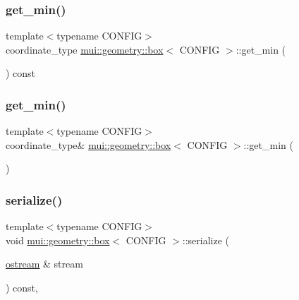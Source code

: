 \subsubsection{\texorpdfstring{get\+\_\+min()}{get\_min()}\hspace{0.1cm}{\footnotesize\ttfamily [1/2]}}
{\footnotesize\ttfamily template$<$typename C\+O\+N\+F\+IG$>$ \\
coordinate\+\_\+type \hyperlink{classmui_1_1geometry_1_1box}{mui\+::geometry\+::box}$<$ C\+O\+N\+F\+IG $>$\+::get\+\_\+min (\begin{DoxyParamCaption}{ }\end{DoxyParamCaption}) const\hspace{0.3cm}{\ttfamily [inline]}}

\mbox{\label{classmui_1_1geometry_1_1box_a8bbabc54ec2b2d7491d8aff412431f40}} 
\subsubsection{\texorpdfstring{get\+\_\+min()}{get\_min()}\hspace{0.1cm}{\footnotesize\ttfamily [2/2]}}
{\footnotesize\ttfamily template$<$typename C\+O\+N\+F\+IG$>$ \\
coordinate\+\_\+type\& \hyperlink{classmui_1_1geometry_1_1box}{mui\+::geometry\+::box}$<$ C\+O\+N\+F\+IG $>$\+::get\+\_\+min (\begin{DoxyParamCaption}{ }\end{DoxyParamCaption})\hspace{0.3cm}{\ttfamily [inline]}}

\mbox{\label{classmui_1_1geometry_1_1box_aea666920fb81b48c7561df7d7da8a0d6}} 
\subsubsection{\texorpdfstring{serialize()}{serialize()}}
{\footnotesize\ttfamily template$<$typename C\+O\+N\+F\+IG$>$ \\
void \hyperlink{classmui_1_1geometry_1_1box}{mui\+::geometry\+::box}$<$ C\+O\+N\+F\+IG $>$\+::serialize (\begin{DoxyParamCaption}\item[{\hyperlink{classmui_1_1ostream}{ostream} \&}]{stream }\end{DoxyParamCaption}) const\hspace{0.3cm}{\ttfamily [inline]}, {\ttfamily [virtual]}}



